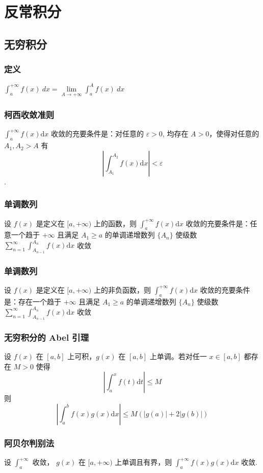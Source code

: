 \chapter{反常积分}
	\section{无穷积分}
		\subsection{定义}
			$\int_{a}^{+\infty} f(x) \ dx =  \lim\limits_{A\to +\infty} \int_{a}^{A} f(x) \ dx$
		
		\subsection{柯西收敛准则}
			$\int_a^{+\infty} f(x) \text{d} x$ 收敛的充要条件是：对任意的 $\varepsilon>0$, 均存在 $A>0$，使得对任意的 $A_1,A_2>A$ 有
			$$\left|\int_{A_1}^{A_2} f(x) \text{d} x\right|<\varepsilon$$.
		
		\subsection{单调数列}
			设 $f(x)$ 是定义在 $[a,+\infty)$ 上的函数，则 $\int_a^{+\infty} f(x) \text{d} x$ 收敛的充要条件是：任意一个趋于 $+\infty$ 且满足 $A_1\ge a$ 的单调递增数列 $\{A_n\}$ 使级数 $\sum\limits_{n=1}^\infty \int_{A_{n-1}}^{A_n} f(x) \text{d} x$ 收敛
		
		\subsection{单调数列}
			设 $f(x)$ 是定义在 $[a,+\infty)$ 上的非负函数，则 $\int_a^{+\infty} f(x) \text{d} x$ 收敛的充要条件是：存在一个趋于 $+\infty$ 且满足 $A_1\ge a$ 的单调递增数列 $\{A_n\}$ 使级数 $\sum\limits_{n=1}^\infty \int_{A_{n-1}}^{A_n} f(x) \text{d} x$ 收敛
		
			
		\subsection{无穷积分的 Abel 引理}
			设 $f(x)$ 在 $[a,b]$ 上可积，$g(x)$ 在 $[a,b]$ 上单调。若对任一 $x \in [a,b]$ 都存在 $M>0$ 使得 $$\left|\int_a^x f(t) \text{d} t\right| \le M$$
			则 
			$$\left|\int_a^b f(x)g(x) \text{d} x\right|\le M(|g(a)|+2|g(b)|)$$
			
		\subsection{阿贝尔判别法}
			设 $\int_a^{+\infty}$ 收敛， $g(x)$ 在 $[a,+\infty)$ 上单调且有界，则 $\int_a^{+\infty} f(x)g(x) \text{d} x$ 收敛.
		
